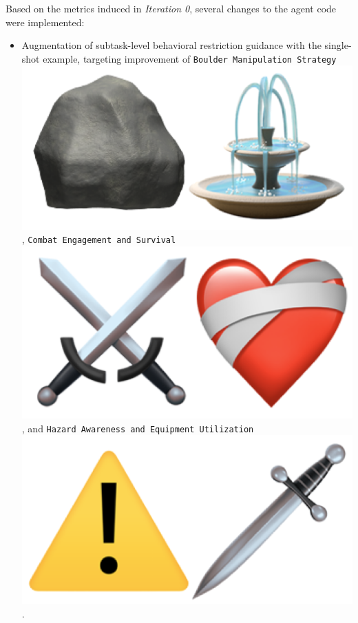 \begin{flushleft}
	Based on the metrics induced in \emph{Iteration 0}, several changes to the
	agent code were implemented:
	\begin{itemize}
		\item Augmentation of subtask-level behavioral restriction guidance with the
			single-shot example, targeting improvement of \texttt{Boulder Manipulation
			Strategy}
			\includegraphics[scale=0.05]{figs/emojis/mini_4.png}
			, \texttt{Combat Engagement and Survival}
			\includegraphics[scale=0.05]{figs/emojis/mini_5.png}
			, and \texttt{Hazard Awareness and Equipment Utilization}
			\includegraphics[scale=0.05]{figs/emojis/mini_3.png}
			.


\end{itemize}
\end{flushleft}
